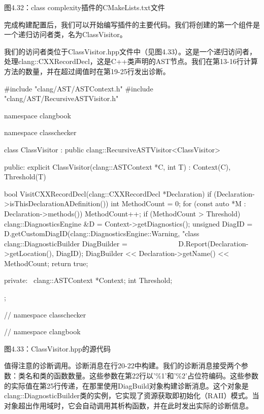 \begin{center}
图4.32：class complexity插件的CMakeLists.txt文件
\end{center}

完成构建配置后，我们可以开始编写插件的主要代码。我们将创建的第一个组件是一个递归访问者类，名为ClassVisitor。


我们的访问者类位于ClassVisitor.hpp文件中（见图4.33）。这是一个递归访问者，处理clang::CXXRecordDecl，这是C++类声明的AST节点。我们在第13-16行计算方法的数量，并在超过阈值时在第19-25行发出诊断。

\begin{cpp}
#include "clang/AST/ASTContext.h"
#include "clang/AST/RecursiveASTVisitor.h"

namespace clangbook {
namespace classchecker {
class ClassVisitor : public clang::RecursiveASTVisitor<ClassVisitor> {
public:
  explicit ClassVisitor(clang::ASTContext *C, int T)
    : Context(C), Threshold(T) {}

  bool VisitCXXRecordDecl(clang::CXXRecordDecl *Declaration) {
    if (Declaration->isThisDeclarationADefinition()) {
      int MethodCount = 0;
      for (const auto *M : Declaration->methods()) {
        MethodCount++;
      }
      if (MethodCount > Threshold) {
        clang::DiagnosticsEngine &D = Context->getDiagnostics();
        unsigned DiagID =
          D.getCustomDiagID(clang::DiagnosticsEngine::Warning,
                            "class %
        clang::DiagnosticBuilder DiagBuilder =
               D.Report(Declaration->getLocation(), DiagID);
        DiagBuilder << Declaration->getName() << MethodCount;
      }
    }
    return true;
  }

private:
  clang::ASTContext *Context;
  int Threshold;
};
} // namespace classchecker
} // namespace clangbook
\end{cpp}


\begin{center}
图4.33：ClassVisitor.hpp的源代码
\end{center}

值得注意的诊断调用。诊断消息在行20-22中构建。我们的诊断消息接受两个参数：类名和类的函数数量。这些参数在第22行以'\%1'和'\%2'占位符编码。这些参数的实际值在第25行传递，在那里使用DiagBuild对象构建诊断消息。这个对象是clang::DiagnosticBuilder类的实例，它实现了资源获取即初始化（RAII）模式。当对象超出作用域时，它会自动调用其析构函数，并在此时发出实际的诊断信息。

